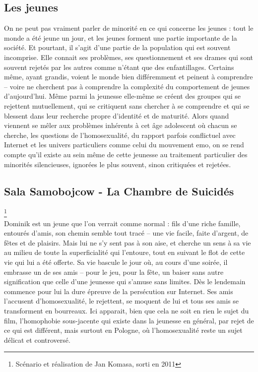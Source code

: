 \documentclass[12pt]{amsart}
\begin{document}
\begin{multicols}{2}
\clearpage
\section{Les jeunes}

On ne peut pas vraiment parler de minorité en ce qui concerne les jeunes : tout le monde a été jeune un jour, et les jeunes forment une partie importante de la société. Et pourtant, il s’agit d’une partie de la population qui est souvent incomprise. Elle connait ses problèmes, ses questionnement et ses drames qui sont souvent rejetés par les autres comme n’étant que des enfantillages. Certains même, ayant grandis, voient le monde bien différemment et peinent à comprendre – voire ne cherchent pas à comprendre la complexité du comportement de jeunes d’aujourd’hui. Même parmi la jeunesse elle-même se créent des groupes qui se rejettent mutuellement, qui se critiquent sans chercher à se comprendre et qui se blessent dans leur recherche propre d’identité et de maturité. Alors quand viennent se mêler aux problèmes inhérents à cet âge adolescent où chacun se cherche, les questions de l’homosexualité, du rapport parfois conflictuel avec Internet et les univers particuliers comme celui du mouvement emo, on se rend compte qu’il existe au sein même de cette jeunesse au traitement particulier des minorités silencieuses, ignorées le plus souvent, sinon critiquées et rejetées.

\subsection*{Sala Samobojcow - La Chambre de Suicidés}\footnote{Scénario et réalisation de Jan Komasa, sorti en 2011} \\
Dominik est un jeune que l’on verrait comme normal : fils d’une riche famille, entourés d’amis, son chemin semble tout tracé – une vie facile, faite d’argent, de fêtes et de plaisirs. Mais lui ne s’y sent pas à son aise, et cherche un sens à sa vie au milieu de toute la superficialité qui l’entoure, tout en suivant le flot de cette vie qui lui a été offerte. Sa vie bascule le jour où, au cours d’une soirée, il embrasse un de ses amis – pour le jeu, pour la fête, un baiser sans autre signification que celle d’une jeunesse qui s’amuse sans limites. Dès le lendemain commence pour lui la dure épreuve de la persécution sur Internet. Ses amis l’accusent d’homosexualité, le rejettent, se moquent de lui et tous ses amis se transforment en bourreaux. 
Ici apparait, bien que cela ne soit en rien le sujet du film, l’homophobie sous-jacente qui existe dans la jeunesse en général, par rejet de ce qui est différent, mais surtout en Pologne, où l’homosexualité reste un sujet délicat et controversé.


\end{multicols}
\end{document}
